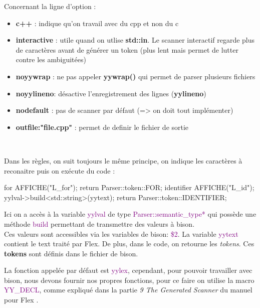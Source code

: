 \documentclass[a4paper]{article}%
\begin{document}
Concernant la ligne d'option :
\begin{itemize}
\item \textbf{c++} : indique qu'on travail avec du cpp et non du c
\item \textbf{interactive} : utile quand on utlise \textbf{std::in}. Le scanner interactif regarde plus de caractères avant de générer un token (plus lent mais permet de lutter contre les ambiguitées)
\item \textbf{noyywrap} : ne pas appeler \textbf{yywrap()} qui permet de parser plusieurs fichiers
\item \textbf{noyylineno}: désactive l'enregistrement des lignes (\textbf{yylineno})
\item \textbf{nodefault} : pas de scanner par défaut (=> on doit tout implémenter)
\item \textbf{outfile:"file.cpp"} : permet de definir le fichier de sortie
\end{itemize}\leavevmode\\[3\baselineskip]


\noindent


Dans les règles, on suit toujours le même principe, on indique les caractères à reconaitre puis on exécute du code :\\

\begin{code}
for          { AFFICHE("L_for"); return Parser::token::FOR; }
{identifier} {
  AFFICHE("L_id");
  yylval->build<std::string>(yytext);
  return Parser::token::IDENTIFIER;
}
\end{code}\leavevmode\newline

\noindent

Ici on a accès à la variable \textcolor{purple}{yylval} de type
\textcolor{purple}{Parser::semantic\_type*} qui possède une méthode
\textcolor{purple}{build} permettant de transmettre des valeurs à bison.\\

Ces valeurs sont accessibles via les variables de bison: \textcolor{purple}{\$2}. La variable
\textcolor{purple}{yytext} contient le text traité par Flex. De plus, dans le code, on retourne
les \textit{tokens}. Ces \textbf{tokens} sont définis dans le fichier de bison.
\newline

La fonction appelée par défaut est \textcolor{purple}{yylex}, cependant, pour
pouvoir travailler avec bison, nous devons fournir nos propres fonctions, pour
ce faire on utilise la macro \textcolor{purple}{YY\_DECL}, comme expliqué dans
la partie \textit{9 The Generated Scanner} du manuel pour Flex
\cite{flexmanual}.
\end{document}
